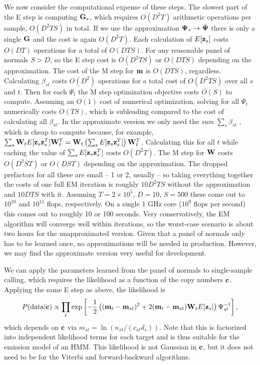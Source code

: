 \documentclass[nofootinbib,amssymb,amsmath]{revtex4}
\newcommand{\vc}{{\bf c}}
\newcommand{\vz}{{\bf z}}
\newcommand{\vm}{{\bf m}}
\newcommand{\vG}{{\bf G}}
\newcommand{\vW}{{\bf W}}
\newcommand{\vPsi}{{\bf \Psi}}
\begin{document}
We now consider the computational expense of these steps.  The slowest part of the E step is computing $\vG_s$, which requires $O(D^2 T)$ arithmetic operations per sample, $O(D^2 T S)$ in total.  If we use the approximation $\vPsi_s \rightarrow \bar{\vPsi}$ there is only a single $\vG$ and the cost is again $O(D^2 T)$.  Each calculation of $E[\vz_s]$ costs $O(D T)$ operations for a total of $O(D T S)$.  For any reasonable panel of normals $S > D$, so the E step cost is $O(D^2 T S)$ or $O(D T S)$ depending on the approximation.  The cost of the M step for $\vm$ is $O(D T S)$, regardless.  Calculating $\beta_{st}$ costs $O(D^2)$ operations for a total cost of $O(D^2 T S)$ over all $s$ and $t$.  Then for each $\Psi_t$ the M step optimization objective costs $O(S)$ to compute.  Assuming an $O(1)$ cost of numerical optimization, solving for all $\Psi_t$ numerically costs $O(T S)$, which is subleading compared to the cost of calculating all $\beta_{st}$.  In the approximate version we only need the \textit{sum} $\sum_s \beta_{st}$ , which is cheap to compute because, for example, $\sum_s \vW_t  E[\vz_s \vz_s^T] \vW_t^T = \vW_t  \left( \sum_s E[\vz_s \vz_s^T] \right) \vW_t^T$.  Calculating this for all $t$ while caching the value of $ \sum_s E[\vz_s \vz_s^T] $ costs $O(D^2 T)$.  The M step for $\vW$ costs $O(D^2 S T)$ or $O(D S T)$ depending on the approximation.    The dropped prefactors for all these are small -- 1 or 2, usually -- so taking everything together the costs of one full EM iteration is roughly $10 D^2 T S$ without the approximation and $10 D T S$ with it.  Assuming $T = 2 \times 10^5$, $D = 10$, $S = 500$ these come out to $10^{10}$ and $10^{11}$ flops, respectively.  On a single 1 GHz core ($10^9$ flops per second) this comes out to roughly 10 or 100 seconds.  Very conservatively, the EM algorithm will converge well within iterations, so the worst-case scenario is about two hours for the unapproximated version.  Given that a panel of normals only has to be learned once, no approximations will be needed in production.  However, we may find the approximate version very useful for development.


We can apply the parameters learned from the panel of normals to single-sample calling, which requires the likelihood as a function of the copy numbers $\vc$.  Applying the same E step as above, the likelihood is
\begin{equation}
P({\rm data} | \vc) \propto \prod_t \exp \left[ -\frac{1}{2} \left(  (\vm_t - \vm_{st})^2 +2 (\vm_t - \vm_{st}) \vW_{t} E[\vz_{s}] \right)\Psi_{st}^{-1} \right],
\end{equation}
which depends on $\vc$ via $m_{st} = \ln \left( n_{st} / (c_{st} d_s) \right)$.  Note that this is factorized into independent likelihood terms for each target and is thus suitable for the emission model of an HMM.  This likelihood is not Gaussian in $\vc$, but it does not need to be for the Viterbi and forward-backward algorithms.
\end{document}
